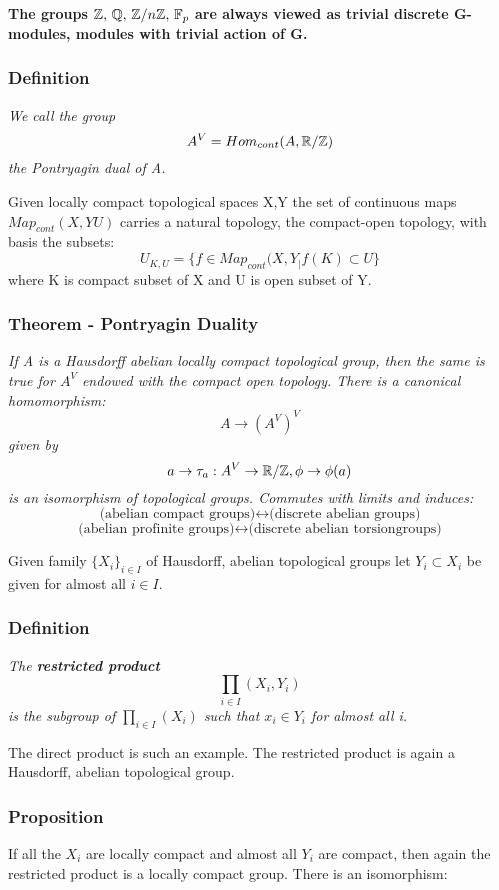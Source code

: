 \textbf{The groups $\mathbb Z, \, \mathbb Q, \, \mathbb Z/n\mathbb Z,\, \mathbb F_p$ are always viewed as trivial discrete G-modules, modules with trivial action of G.}

\subsubsection{Definition}
\emph{We call the group $$A^V  = Hom_{cont} (A, \mathbb R / \mathbb Z)$$ the Pontryagin dual of A.}

Given locally compact topological spaces X,Y the set of continuous maps $Map_{cont} (X,YU)$ carries a natural topology, the compact-open topology, with basis the subsets:
$$U_{K,U} = \{ f\in Map_{cont}(X,Y_\vert f(K) \subset U\}$$ where K is compact subset of X and U is open subset of Y.

\subsubsection{Theorem - Pontryagin Duality}
\emph{If A is a Hausdorff abelian locally compact topological group, then the same is true for $A^V$ endowed with the compact open topology. There is a canonical homomorphism:
$$A\rightarrow {(A^V)}^V$$
given by
$$a\rightarrow \tau_a : A^V\rightarrow \mathbb R / \mathbb Z, \phi \rightarrow \phi (a)$$ is an isomorphism of topological groups. Commutes with limits and induces:
$$\text{(abelian compact groups)} \leftrightarrow \text{(discrete abelian groups)}$$ 
$$\text{(abelian profinite groups)} \leftrightarrow \text{(discrete abelian torsiongroups)}$$}

Given family $\{X_i\}_{i\in I}$ of Hausdorff, abelian topological groups let $Y_i\subset X_i$ be given for almost all $i\in I$.

\subsubsection{Definition}
\emph{The \textbf{restricted product}
$$\prod_{i\in I} (X_i, Y_i)$$ is the subgroup of $\prod_{i\in I} (X_i)$ such that $x_i\in Y_i$ for almost all i.}

The direct product is such an example. The restricted product is again a Hausdorff, abelian topological group.

\subsubsection{Proposition}
If all the $X_i$ are locally compact and almost all $Y_i$ are compact, then again the restricted product is a locally compact group. There is an isomorphism:

